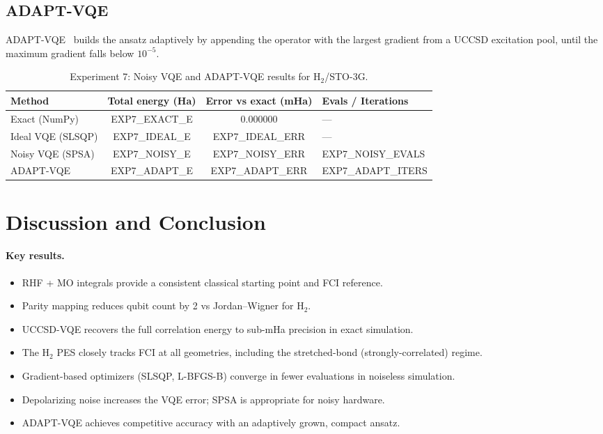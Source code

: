 \documentclass[11pt,a4paper]{article}
\begin{document}
\subsection{ADAPT-VQE}
ADAPT-VQE~\cite{grimsley2019} builds the ansatz adaptively by appending the
operator with the largest gradient from a UCCSD excitation pool, until the
maximum gradient falls below $10^{-5}$.

\begin{table}[H]
\centering\small
\begin{tabular}{lS[table-format=2.10]S[table-format=+2.6]l}
\toprule
Method & {Total energy (Ha)} & {Error vs exact (mHa)} & {Evals / Iterations} \\
\midrule
Exact (NumPy)        & EXP7\_EXACT\_E  & 0.000000 & --- \\
Ideal VQE (SLSQP)    & EXP7\_IDEAL\_E  & EXP7\_IDEAL\_ERR  & --- \\
Noisy VQE (SPSA)     & EXP7\_NOISY\_E  & EXP7\_NOISY\_ERR  & EXP7\_NOISY\_EVALS \\
ADAPT-VQE            & EXP7\_ADAPT\_E  & EXP7\_ADAPT\_ERR  & EXP7\_ADAPT\_ITERS \\
\bottomrule
\end{tabular}
\caption{Experiment 7: Noisy VQE and ADAPT-VQE results for H$_2$/STO-3G.}
\end{table}

\section{Discussion and Conclusion}

\paragraph{Key results.}
\begin{itemize}
  \item RHF + MO integrals provide a consistent classical starting point and FCI reference.
  \item Parity mapping reduces qubit count by 2 vs Jordan--Wigner for H$_2$.
  \item UCCSD-VQE recovers the full correlation energy to sub-mHa precision in exact simulation.
  \item The H$_2$ PES closely tracks FCI at all geometries, including the
        stretched-bond (strongly-correlated) regime.
  \item Gradient-based optimizers (SLSQP, L-BFGS-B) converge in fewer evaluations
        in noiseless simulation.
  \item Depolarizing noise increases the VQE error; SPSA is appropriate for noisy hardware.
  \item ADAPT-VQE achieves competitive accuracy with an adaptively grown, compact ansatz.
\end{itemize}
\end{document}

